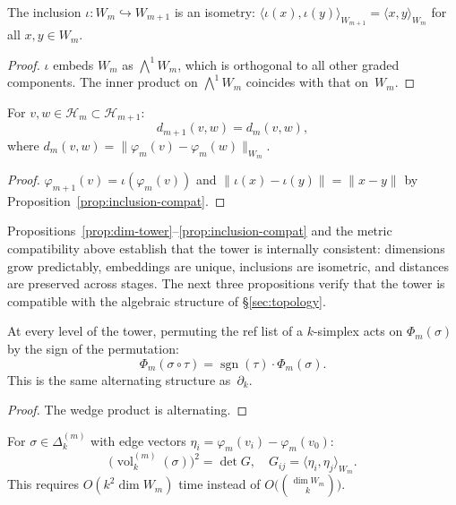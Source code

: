 \begin{proposition}\label{prop:inclusion-compat}
The inclusion $\iota: W_m \hookrightarrow W_{m+1}$ is an isometry: $\langle \iota(x), \iota(y) \rangle_{W_{m+1}} = \langle x, y \rangle_{W_m}$ for all $x, y \in W_m$.
\end{proposition}

\begin{proof}
$\iota$ embeds $W_m$ as $\bigwedge^1 W_m$, which is orthogonal to all other graded components. The inner product on $\bigwedge^1 W_m$ coincides with that on~$W_m$.
\end{proof}

\begin{proposition}
For $v, w \in \mathcal{H}_m \subset \mathcal{H}_{m+1}$:
\[
  d_{m+1}(v,w) = d_m(v,w),
\]
where $d_m(v,w) = \|\varphi_m(v) - \varphi_m(w)\|_{W_m}$.
\end{proposition}

\begin{proof}
$\varphi_{m+1}(v) = \iota(\varphi_m(v))$ and $\|\iota(x) - \iota(y)\| = \|x - y\|$ by Proposition~\ref{prop:inclusion-compat}.
\end{proof}

Propositions~\ref{prop:dim-tower}--\ref{prop:inclusion-compat} and the metric compatibility above establish that the tower is internally consistent: dimensions grow predictably, embeddings are unique, inclusions are isometric, and distances are preserved across stages. The next three propositions verify that the tower is compatible with the algebraic structure of \S\ref{sec:topology}.

\begin{proposition}
At every level of the tower, permuting the ref list of a $k$-simplex acts on $\Phi_m(\sigma)$ by the sign of the permutation:
\[
  \Phi_m(\sigma \circ \tau) = \operatorname{sgn}(\tau) \cdot \Phi_m(\sigma).
\]
This is the same alternating structure as~$\partial_k$.
\end{proposition}

\begin{proof}
The wedge product is alternating.
\end{proof}

\begin{proposition}
For $\sigma \in \Delta_k^{(m)}$ with edge vectors $\eta_i = \varphi_m(v_i) - \varphi_m(v_0)$:
\[
  \bigl(\operatorname{vol}_k^{(m)}(\sigma)\bigr)^2 = \det G, \quad G_{ij} = \langle \eta_i, \eta_j \rangle_{W_m}.
\]
This requires $O(k^2 \dim W_m)$ time instead of $O\bigl(\binom{\dim W_m}{k}\bigr)$.
\end{proposition}

